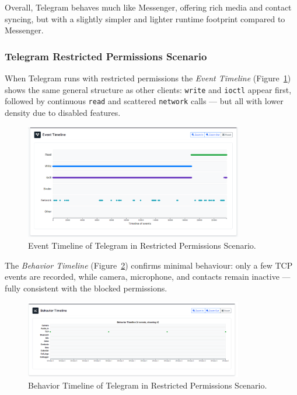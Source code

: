 \documentclass[a4paper,12pt]{report}
\begin{document}
Overall, Telegram behaves much like Messenger, offering rich media and contact syncing, but with a slightly simpler and lighter runtime footprint compared to Messenger.

\subsubsection{Telegram Restricted Permissions Scenario}

When Telegram runs with restricted permissions the \textit{Event Timeline} (Figure~\ref{fig:telegram-none-events}) shows the same general structure as other clients: \texttt{write} and \texttt{ioctl} appear first, followed by continuous \texttt{read} and scattered \texttt{network} calls — but all with lower density due to disabled features.

\begin{figure}[H]
    \centering
    \includegraphics[width=0.85\textwidth]{telegram-none-events.png}
    \caption{Event Timeline of Telegram in Restricted Permissions Scenario.}
    \label{fig:telegram-none-events}
\end{figure}

The \textit{Behavior Timeline} (Figure~\ref{fig:telegram-none-behav}) confirms minimal behaviour: only a few TCP events are recorded, while camera, microphone, and contacts remain inactive — fully consistent with the blocked permissions.

\begin{figure}[H]
    \centering
    \includegraphics[width=0.85\textwidth]{telegram-none-behav.png}
    \caption{Behavior Timeline of Telegram in Restricted Permissions Scenario.}
    \label{fig:telegram-none-behav}
\end{figure}
\end{document}

